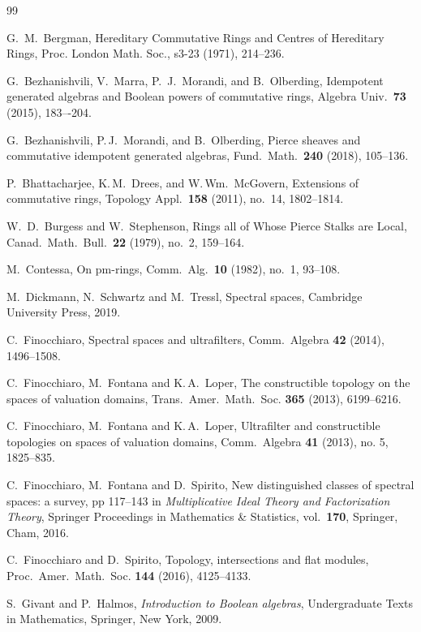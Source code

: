 \documentclass[11pt]{amsart}
\theoremstyle{definition}
\begin{document}
\begin{thebibliography}{99}


 G.~M.~Bergman,   Hereditary Commutative Rings and Centres of Hereditary Rings,  Proc.  London Math. Soc., s3-23 (1971), 214--236.

 G.~Bezhanishvili, V.~Marra, P.~J.~Morandi, and B.~Olberding, Idempotent generated algebras and Boolean powers of commutative rings, Algebra Univ.~\textbf{73} (2015), 183–-204.

 G.~Bezhanishvili,   P.\,J.~Morandi, and B.~Olberding, Pierce sheaves and commutative idempotent generated algebras, Fund.~Math.~\textbf{240} (2018), 105--136.

 P.~Bhattacharjee, K.\,M.~Drees, and W.\,Wm.~McGovern, Extensions of commutative rings, Topology Appl.~\textbf{158} (2011), no.~14, 1802--1814.

 W.~D.~Burgess and W.~Stephenson, Rings all of Whose Pierce Stalks are Local, Canad.~Math.~Bull.~\textbf{22} (1979), no.~2, 159--164.

 M.~Contessa, On pm-rings, Comm.~Alg.~\textbf{10} (1982), no.~1, 93--108.

 M.~Dickmann, N.~Schwartz and M.~Tressl, Spectral spaces, Cambridge University Press, 2019. 

 C.~Finocchiaro, Spectral spaces and ultrafilters, Comm.~Algebra \textbf{42} (2014), 1496--1508.

C.~Finocchiaro, M.~Fontana and K.\,A.~Loper, The constructible topology on the spaces of valuation domains, Trans.~Amer.~Math.~Soc. {\bf 365} (2013), 6199--6216.

 C.~Finocchiaro, M.~Fontana and K.\,A.~Loper, Ultrafilter and constructible topologies on spaces of valuation domains, Comm.~Algebra {\bf 41} (2013), no. 5, 1825--835.

C.~Finocchiaro, M.~Fontana and D.~Spirito, New distinguished classes of spectral spaces: a
survey, pp 117--143 in {\it Multiplicative Ideal Theory and Factorization Theory}, Springer Proceedings in Mathematics \& Statistics, vol.~\textbf{170}, Springer, Cham, 2016.

C.~Finocchiaro and D.~Spirito, Topology, intersections and flat modules, Proc.~Amer.~Math.~Soc. {\bf 144} (2016), 4125--4133.

 S.~Givant and P.~Halmos, {\it Introduction to Boolean algebras}, Undergraduate Texts in Mathematics, Springer, New York, 2009.


\end{thebibliography}
\end{document}
